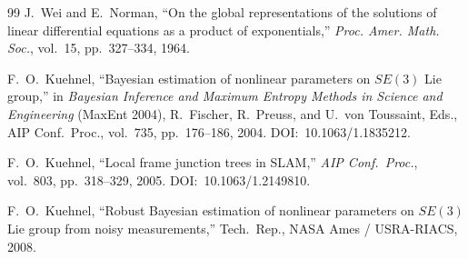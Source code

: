 \documentclass[journal]{IEEEtran}
\begin{document}
\begin{thebibliography}{99}
J.~Wei and E.~Norman,
``On the global representations of the solutions of linear 
differential equations as a product of exponentials,''
\emph{Proc. Amer. Math. Soc.}, vol.~15, pp.~327--334, 1964.

F.~O.~Kuehnel,
``Bayesian estimation of nonlinear parameters on $SE(3)$ 
Lie group,''
in \emph{Bayesian Inference and Maximum Entropy Methods 
in Science and Engineering} (MaxEnt 2004),
R.~Fischer, R.~Preuss, and U.~von Toussaint, Eds.,
AIP Conf.\ Proc., vol.~735, pp.~176--186, 2004.
DOI:~10.1063/1.1835212.

F.~O.~Kuehnel,
``Local frame junction trees in SLAM,''
\emph{AIP Conf.\ Proc.}, vol.~803, pp.~318--329, 2005.
DOI:~10.1063/1.2149810.

F.~O.~Kuehnel,
``Robust Bayesian estimation of nonlinear parameters on 
$SE(3)$ Lie group from noisy measurements,''
Tech.\ Rep., NASA Ames / USRA-RIACS, 2008.

\end{thebibliography}
\end{document}
